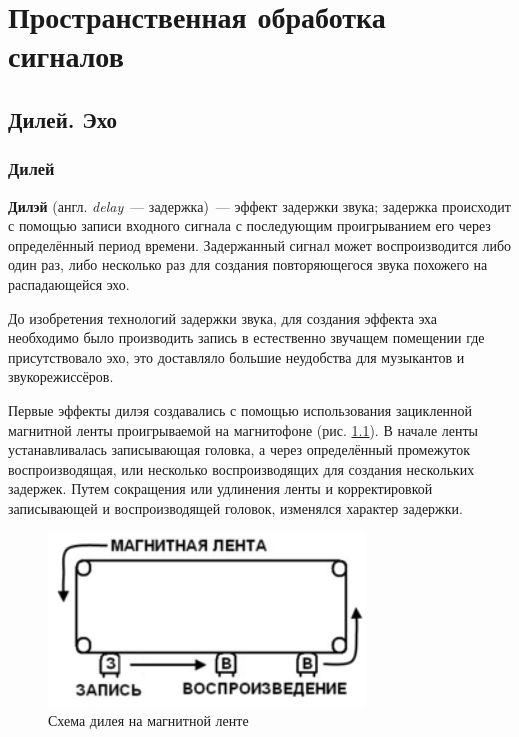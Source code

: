 \documentclass[oneside, final, 14pt]{extreport}
\begin{document}
\setcounter{chapter}{7}
\chapter{Пространственная обработка сигналов}
\tableofcontents

\section{Дилей. Эхо}
\subsection{Дилей}
\textbf{Дилэй} (англ. \emph{delay}~--- задержка)~--- эффект задержки звука; задержка происходит с помощью записи входного сигнала с последующим проигрыванием его через определённый период времени. Задержанный сигнал может воспроизводится либо один раз, либо несколько раз для создания повторяющегося звука похожего на распадающейся эхо.

До изобретения технологий задержки звука, для создания эффекта эха необходимо было производить запись в естественно звучащем помещении где присутствовало эхо, это доставляло большие неудобства для музыкантов и звукорежиссёров.

Первые эффекты дилэя создавались с помощью использования зацикленной магнитной ленты проигрываемой на магнитофоне (рис. \ref{pic-delay-01}). В начале ленты устанавливалась записывающая головка, а через определённый промежуток воспроизводящая, или несколько воспроизводящих для создания нескольких задержек. Путем сокращения или удлинения ленты и корректировкой записывающей и воспроизводящей головок, изменялся характер задержки.

\begin{figure}[h!]
  \centering
  \includegraphics[width=0.75\textwidth]{pic-delay-01}
  \caption{Схема дилея на магнитной ленте}
  \label{pic-delay-01}
\end{figure}
\end{document}
